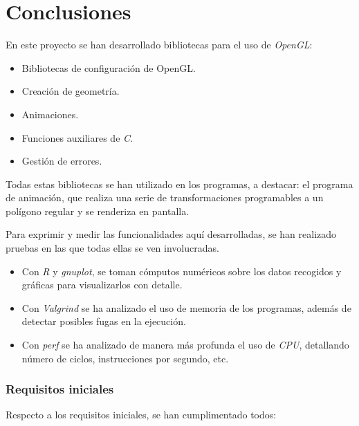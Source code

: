 \chapter{Conclusiones}\label{cap:conclusiones}

En este proyecto se han desarrollado bibliotecas para el uso de \textit{OpenGL}:
\begin{itemize}
    \item Bibliotecas de configuración de OpenGL.
    \item Creación de geometría.
    \item Animaciones.
    \item Funciones auxiliares de \textit{C}.
    \item Gestión de errores.
\end{itemize}

Todas estas bibliotecas se han utilizado en los programas, a destacar: el programa de animación, que realiza una serie de transformaciones programables a un polígono regular y se renderiza en pantalla. 

Para exprimir y medir las funcionalidades aquí desarrolladas, se han realizado pruebas en las que todas ellas se ven involucradas.
\begin{itemize}
    \item Con \textit{R} y \textit{gnuplot}, se toman cómputos numéricos sobre los datos recogidos y gráficas para visualizarlos con detalle.
    \item Con \textit{Valgrind} se ha analizado el uso de memoria de los programas, además de detectar posibles fugas en la ejecución.
    \item Con \textit{perf} se ha analizado de manera más profunda el uso de \textit{CPU}, detallando número de ciclos, instrucciones por segundo, etc.
\end{itemize}

\subsection{Requisitos iniciales}

Respecto a los requisitos iniciales, se han cumplimentado todos:

